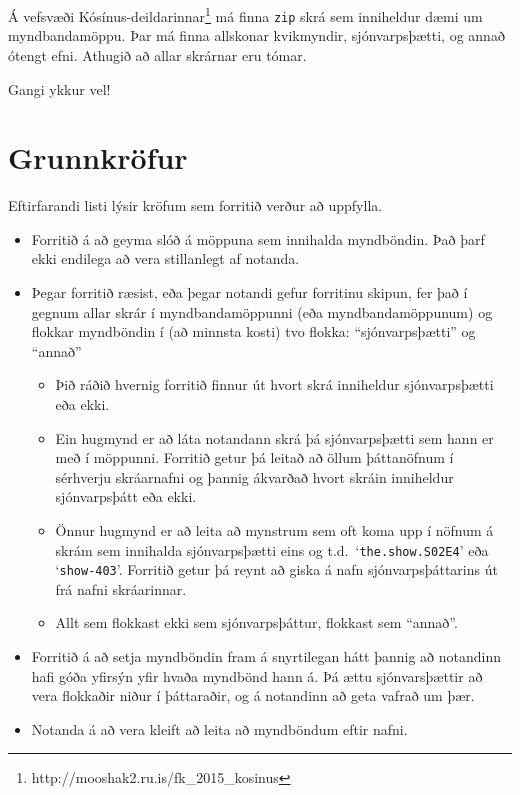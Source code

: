 \documentclass{article}
\begin{document}
Á vefsvæði
Kósínus-deildarinnar\footnote{http://mooshak2.ru.is/fk\_{}2015\_{}kosinus} má
finna \texttt{zip} skrá sem inniheldur dæmi um myndbandamöppu. Þar má finna
allskonar kvikmyndir, sjónvarpsþætti, og annað ótengt efni. Athugið að allar
skrárnar eru tómar.

Gangi ykkur vel!

\section*{Grunnkröfur}
Eftirfarandi listi lýsir kröfum sem forritið verður að uppfylla.
\begin{itemize}
    \item Forritið á að geyma slóð á möppuna sem innihalda myndböndin. Það þarf
        ekki endilega að vera stillanlegt af notanda.
    \item Þegar forritið ræsist, eða þegar notandi gefur forritinu skipun, fer
        það í gegnum allar skrár í myndbandamöppunni (eða myndbandamöppunum) og
        flokkar myndböndin í (að minnsta kosti) tvo flokka: “sjónvarpsþætti” og
        “annað”
        \begin{itemize}
            \item Þið ráðið hvernig forritið finnur út hvort skrá inniheldur
                sjónvarpsþætti eða ekki.
            \item Ein hugmynd er að láta notandann skrá þá sjónvarpsþætti sem
                hann er með í möppunni. Forritið getur þá leitað að öllum
                þáttanöfnum í sérhverju skráarnafni og þannig ákvarðað hvort
                skráin inniheldur sjónvarpsþátt eða ekki.
            \item Önnur hugmynd er að leita að mynstrum sem oft koma upp í
                nöfnum á skrám sem innihalda sjónvarpsþætti eins og t.d.\ 
                `\texttt{the.show.S02E4}' eða `\texttt{show-403}'. Forritið getur þá reynt að
                giska á nafn sjónvarpsþáttarins út frá nafni skráarinnar.
            \item Allt sem flokkast ekki sem sjónvarpsþáttur, flokkast sem "`annað"'.
        \end{itemize}
    \item Forritið á að setja myndböndin fram á snyrtilegan hátt þannig að
        notandinn hafi góða yfirsýn yfir hvaða myndbönd hann á. Þá ættu
        sjónvarsþættir að vera flokkaðir niður í þáttaraðir, og á notandinn að
        geta vafrað um þær.
    \item Notanda á að vera kleift að leita að myndböndum eftir nafni.
\end{itemize}
\end{document}
